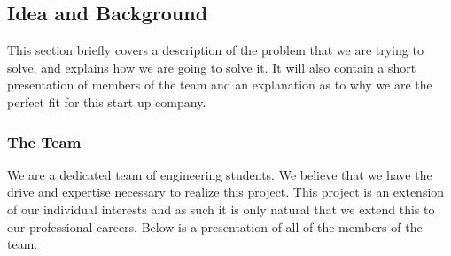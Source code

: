 \subsection{Idea and Background}
This section briefly covers a description of the problem that we are trying to solve, and explains how we are going to solve it. It will also contain a short presentation of members of the team and an explanation as to why we are the perfect fit for this start up company.

\subsubsection{The Team}
We are a dedicated team of engineering students. We believe that we have the drive and expertise necessary to realize this project. This project is an extension of our individual interests and as such it is only natural that we extend this to our professional careers. Below is a presentation of all of the members of the team.

